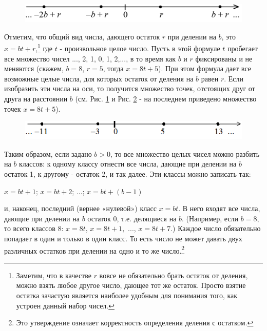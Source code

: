 \begin{figure}[h]
  \centering
\includegraphics[width=.5\linewidth]{./img/axis3}
  \caption{}
  \label{axis3}
\end{figure}

Отметим, что общий вид числа, дающего остаток $r$ при делении на $b$, это $x = bt + r$,\footnote{Заметим, что в качестве $r$ вовсе не обязательно брать остаток от деления, можно взять любое другое число, дающее тот же остаток. Просто взятие остатка зачастую является наиболее удобным для понимания того, как устроен данный набор чисел.} где $t$ - произвольное целое число. Пусть в этой формуле $t$ пробегает все множество чисел {..., 2, 1, 0, 1, 2,...}, в то время как $b$ и $r$ фиксированы и не меняются (скажем, $b=8$,  $r=5$, тогда $x=8t+5$). При этом формула дает все возможные целые числа, для которых остаток от деления на $b$ равен $r$. Если изобразить эти числа на оси, то получится множество точек, отстоящих друг от друга на расстоянии $b$ (см. Рис. \ref{axis3} и Рис. \ref{axis4} - на последнем приведено множество точек $x=8t+5$).

\begin{figure}[h]
  \centering
\includegraphics[width=.5\linewidth]{./img/axis4}
  \caption{}
  \label{axis4}
\end{figure}

Таким образом, если задано $b > 0$, то все множество целых чисел можно разбить на $b$ классов: к одному классу отнести все числа, дающие при делении на $b$ остаток 1, к другому - остаток 2, и так далее. Эти классы можно записать так:

\begin{center}
    $x=bt+1$; \hspace{3mm} $x=bt+2$; \hspace{3mm} ...; \hspace{3mm} $x=bt+(b-1)$
\end{center} 

и, наконец, последний (вернее «нулевой») класс $x = bt$. В него входят все числа, дающие при делении на $b$ остаток 0, т.е. делящиеся на $b$. (Например, если $b=8$, то всего классов 8: $x = 8t$, $x = 8t + 1,$ ..., $x = 8t + 7$.) Каждое число обязательно попадает в один и только в один класс. То есть число не может давать двух различных остатков при делении на одно и то же число.\footnote{Это утверждение означает корректность определения деления с остатком.}

